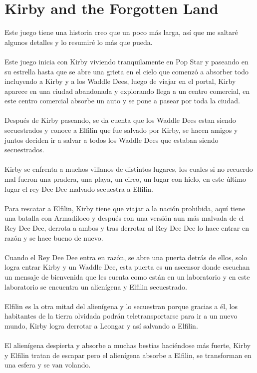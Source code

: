 \documentclass{article}
\begin{document}
\section{Kirby and the Forgotten Land}
Este juego tiene una historia creo que un poco más larga, así que me saltaré algunos detalles y lo resumiré lo más que pueda. \\ \\
Este juego inicia con Kirby viviendo tranquilamente en Pop Star y paseando en su estrella hasta que se abre una grieta en el cielo que comenzó a absorber todo incluyendo a Kirby y a los Waddle Dees, luego de viajar en el portal, Kirby aparece en una ciudad abandonada y explorando llega a un centro comercial, en este centro comercial absorbe un auto y se pone a pasear por toda la ciudad. \\ \\
Después de Kirby paseando, se da cuenta que los Waddle Dees estan siendo secuestrados y conoce a Elfilin que fue salvado por Kirby, se hacen amigos y juntos deciden ir a salvar a todos los Waddle Dees que estaban siendo secuestrados. \\ \\
Kirby se enfrenta a muchos villanos de distintos lugares, los cuales si no recuerdo mal fueron una pradera, una playa, un circo, un lugar con hielo, en este último lugar el rey Dee Dee malvado secuestra a Elfilin. \\ \\
Para rescatar a Elfilin, Kirby tiene que viajar a la nación prohibida, aquí tiene una batalla con Armadiloco y después con una versión aun más malvada de el Rey Dee Dee, derrota a ambos y tras derrotar al Rey Dee Dee lo hace entrar en razón y se hace bueno de nuevo. \\ \\
Cuando el Rey Dee Dee entra en razón, se abre una puerta detrás de ellos, solo logra entrar Kirby y un Waddle Dee, esta puerta es un ascensor donde escuchan un mensaje de bienvenida que les cuenta como están en un laboratorio y en este laboratorio se encuentra un alienígena y Elfilin secuestrado. \\ \\
Elfilin es la otra mitad del alienígena y lo secuestran porque gracias a él, los habitantes de la tierra olvidada podrán teletransportarse para ir a un nuevo mundo, Kirby logra derrotar a Leongar y así salvando a Elfilin. \\ \\
El alienígena despierta y absorbe a muchas bestias haciéndose más fuerte, Kirby y Elfilin tratan de escapar pero el alienígena absorbe a Elfilin, se transforman en una esfera y se van volando. \\ \\
\end{document}

